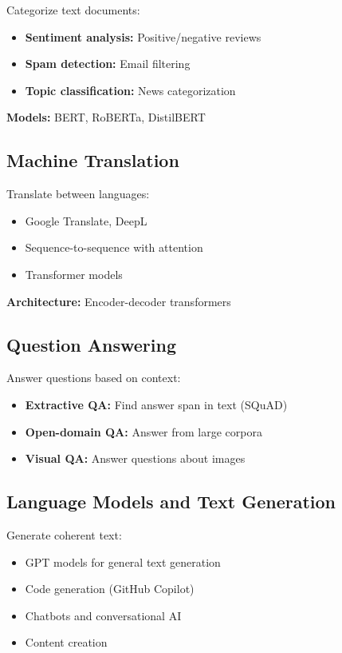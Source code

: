 Categorize text documents:
\begin{itemize}
    \item \textbf{Sentiment analysis:} Positive/negative reviews
    \item \textbf{Spam detection:} Email filtering
    \item \textbf{Topic classification:} News categorization
\end{itemize}

\textbf{Models:} BERT, RoBERTa, DistilBERT

\subsection{Machine Translation}

Translate between languages:
\begin{itemize}
    \item Google Translate, DeepL
    \item Sequence-to-sequence with attention
    \item Transformer models
\end{itemize}

\textbf{Architecture:} Encoder-decoder transformers

\subsection{Question Answering}

Answer questions based on context:
\begin{itemize}
    \item \textbf{Extractive QA:} Find answer span in text (SQuAD)
    \item \textbf{Open-domain QA:} Answer from large corpora
    \item \textbf{Visual QA:} Answer questions about images
\end{itemize}

\subsection{Language Models and Text Generation}

Generate coherent text:
\begin{itemize}
    \item GPT models for general text generation
    \item Code generation (GitHub Copilot)
    \item Chatbots and conversational AI
    \item Content creation
\end{itemize}

